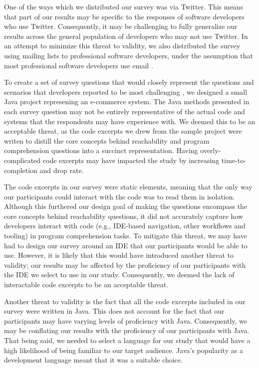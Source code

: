 
\noindent One of the ways which we distributed our survey was via Twitter.  
This means that part of our results may be specific to the responses of
software developers who use Twitter.
Consequently, it may be challenging to fully generalize our results across
the general population of developers who may not use Twitter.
In an attempt to minimize this threat to validity, we also distributed the 
survey using mailing lists to professional software developers, under the
assumption that most professional software developers use email
\cite{gousios-2016-work-practices}.


\par To create a set of survey questions that would closely represent the
questions and scenarios that developers reported to be most challenging
\cite{latoza-2010-hard-questions, latoza-2010-reach}, we designed a small Java
project represening an e-commerce system.
The Java methods presented in each survey question may not be entirely
representative of the actual code and systems that the respondents may have
experience with.
We deemed this to be an acceptable threat, as the code excerpts we drew from
the sample project were writen to distill the core concepts behind
reachability and program comprehension questions into a succinct representation.
Having overly-complicated code excerpts may have impacted the study by
increasing time-to-completion and drop rate.

\par The code excerpts in our survey were static elements, meaning that the
only way our participants could interact with the code was to read them
in isolation.
Although this furthered our design goal of making the questions encompass
the core concepts behind reachability questions, it did not accurately
capture how developers interact with code (e.g., IDE-based navigation, 
other workflows and tooling) in program comprehension tasks.
To mitigate this threat, we may have had to design our survey around an IDE 
that our participants would be able to use.
However, it is likely that this would have introduced another threat to
validity; our results may be affected by the proficiency of our participants
with the IDE we select to use in our study.
Consequently, we deemed the lack of interactable code excerpts to be an 
acceptable threat.

\par Another threat to validity is the fact that all the code
excerpts included in our survey were written in Java.
This does not account for the fact that our participants may have varying
levels of proficiency with Java.
Consequently, we may be conflating our results with the proficiency of our
participants with Java.
That being said, we needed to select a language for our study that would
have a high likelihood of being familiar to our target audience.
Java's popularity as a development language 
\cite{so-2021-dev-survey, jetbrains-2021-dev-survey} meant that it was a 
suitable choice.

\endinput

